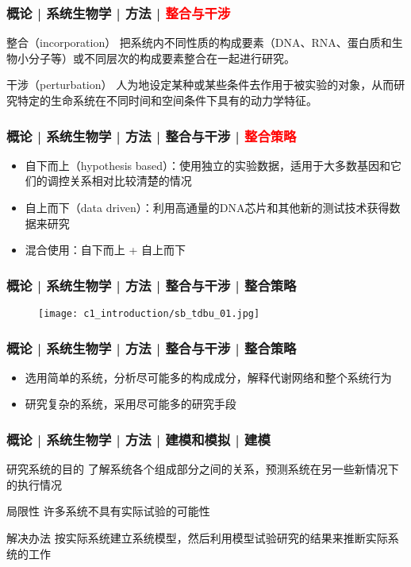 \begin{frame}
  \frametitle{概论 | 系统生物学 | 方法 | \textcolor{red}{整合与干涉}}
  \begin{block}{整合（incorporation）}
把系统内不同性质的构成要素（DNA、RNA、蛋白质和生物小分子等）或不同层次的构成要素整合在一起进行研究。
  \end{block}
  \pause
  \begin{block}{干涉（perturbation）}
人为地设定某种或某些条件去作用于被实验的对象，从而研究特定的生命系统在不同时间和空间条件下具有的动力学特征。 \end{block}
\end{frame}

\begin{frame}
  \frametitle{概论 | 系统生物学 | 方法 | 整合与干涉 | \textcolor{red}{整合策略}}
  \begin{itemize}
    \item 自下而上（hypothesis based）：使用独立的实验数据，适用于大多数基因和它们的调控关系相对比较清楚的情况
    \item 自上而下（data driven）：利用高通量的DNA芯片和其他新的测试技术获得数据来研究
    \item 混合使用：自下而上 + 自上而下
  \end{itemize}
\end{frame}

\begin{frame}
  \frametitle{概论 | 系统生物学 | 方法 | 整合与干涉 | 整合策略}
  \begin{figure}
    \centering
    \texttt{[image: c1\_introduction/sb\_tdbu\_01.jpg]}
  \end{figure}
\end{frame}

\begin{frame}
  \frametitle{概论 | 系统生物学 | 方法 | 整合与干涉 | 整合策略}
  \begin{itemize}
    \item 选用简单的系统，分析尽可能多的构成成分，解释代谢网络和整个系统行为
    \item 研究复杂的系统，采用尽可能多的研究手段
  \end{itemize}
\end{frame}

\begin{frame}
  \frametitle{概论 | 系统生物学 | 方法 | 建模和模拟 | 建模}
  \begin{block}{研究系统的目的}
了解系统各个组成部分之间的关系，预测系统在另一些新情况下的执行情况
  \end{block}
  \pause
  \begin{block}{局限性}
许多系统不具有实际试验的可能性
  \end{block}
  \pause
  \begin{block}{解决办法}
按实际系统建立系统模型，然后利用模型试验研究的结果来推断实际系统的工作
  \end{block}
\end{frame}

